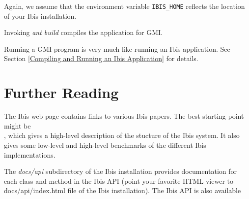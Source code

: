 \documentclass[10pt]{article}
\newcommand{\mysection}[1]{\section{#1}\label{#1}}
\begin{document}
Again, we assume that the environment variable \texttt{IBIS\_HOME} reflects
the location of your Ibis installation.

Invoking \emph{ant build} compiles the application for GMI.

Running a GMI program is very much like running an Ibis application.
See Section \ref{Compiling and Running an Ibis Application} for details.


\mysection{Further Reading}

The Ibis web page
{}
{}
contains links to various Ibis papers.
The best starting point might be \\
{}
{}, which gives a high-level description of the stucture of the Ibis system.
It also gives some low-level and high-level benchmarks of the different Ibis implementations.

The \emph{docs/api} subdirectory of the Ibis installation provides
documentation for each class and method in the Ibis API (point your favorite
HTML viewer to docs/api/index.html file of the Ibis installation).
The Ibis API is also available
\end{document}
